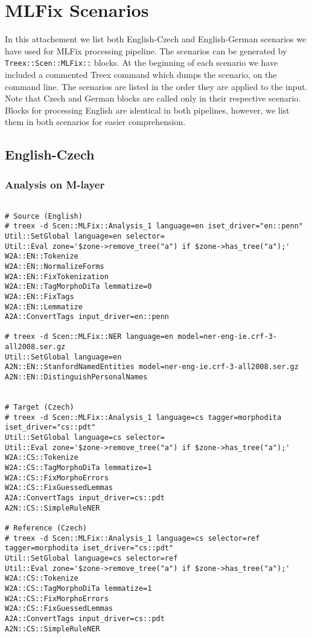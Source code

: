\chapter{MLFix Scenarios}
\label{attach:scen}

In this attachement we list both English-Czech and English-German scenarios we have used for MLFix processing
pipeline. The scenarios can be generated by\linebreak
\texttt{Treex::Scen::MLFix::} blocks. At the beginning
of each scenario we have included a commented Treex command which dumps the scenario,
on the command line. The scenarios
are listed in the order they are applied to the input. Note that Czech and German blocks
are called only in their respective scenario. Blocks for processing English are
identical in both pipelines, however, we list them in both scenarios for easier
comprehension.

\section{English-Czech}

\subsection{Analysis on M-layer}

\lstset{basicstyle=\ttfamily,breaklines=true}
\begin{lstlisting}

# Source (English)
# treex -d Scen::MLFix::Analysis_1 language=en iset_driver="en::penn"
Util::SetGlobal language=en selector=
Util::Eval zone='$zone->remove_tree("a") if $zone->has_tree("a");'
W2A::EN::Tokenize
W2A::EN::NormalizeForms
W2A::EN::FixTokenization
W2A::EN::TagMorphoDiTa lemmatize=0
W2A::EN::FixTags
W2A::EN::Lemmatize
A2A::ConvertTags input_driver=en::penn

# treex -d Scen::MLFix::NER language=en model=ner-eng-ie.crf-3-all2008.ser.gz
Util::SetGlobal language=en
A2N::EN::StanfordNamedEntities model=ner-eng-ie.crf-3-all2008.ser.gz
A2N::EN::DistinguishPersonalNames


# Target (Czech)
# treex -d Scen::MLFix::Analysis_1 language=cs tagger=morphodita iset_driver="cs::pdt"
Util::SetGlobal language=cs selector=
Util::Eval zone='$zone->remove_tree("a") if $zone->has_tree("a");'
W2A::CS::Tokenize
W2A::CS::TagMorphoDiTa lemmatize=1
W2A::CS::FixMorphoErrors
W2A::CS::FixGuessedLemmas
A2A::ConvertTags input_driver=cs::pdt
A2N::CS::SimpleRuleNER

# Reference (Czech)
# treex -d Scen::MLFix::Analysis_1 language=cs selector=ref tagger=morphodita iset_driver="cs::pdt"
Util::SetGlobal language=cs selector=ref
Util::Eval zone='$zone->remove_tree("a") if $zone->has_tree("a");'
W2A::CS::Tokenize
W2A::CS::TagMorphoDiTa lemmatize=1
W2A::CS::FixMorphoErrors
W2A::CS::FixGuessedLemmas
A2A::ConvertTags input_driver=cs::pdt
A2N::CS::SimpleRuleNER

\end{lstlisting}

